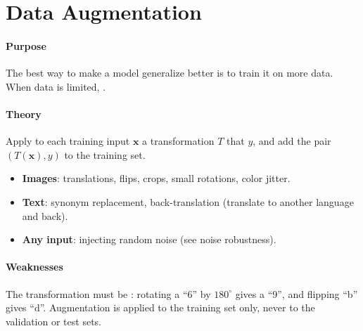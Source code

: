 \section{Data Augmentation}
\paragraph{Purpose}
The best way to make a model generalize better is to train it on more data. When data is
limited, .

\paragraph{Theory}
Apply to each training input $\bm{x}$ a transformation $T$ that  $y$, and add the pair $\left(T(\bm{x}), y\right)$ to the training set.
\begin{itemize}
    \item \textbf{Images}: translations, flips, crops, small rotations, color jitter.
    \item \textbf{Text}: synonym replacement, back-translation (translate to another
        language and back).
    \item \textbf{Any input}: injecting random noise (see noise robustness).
\end{itemize}

\paragraph{Weaknesses}
The transformation must be : rotating a ``6'' by
$180^{\circ}$ gives a ``9'', and flipping ``b'' gives ``d''. Augmentation is applied
to the training set only, never to the validation or test sets.
